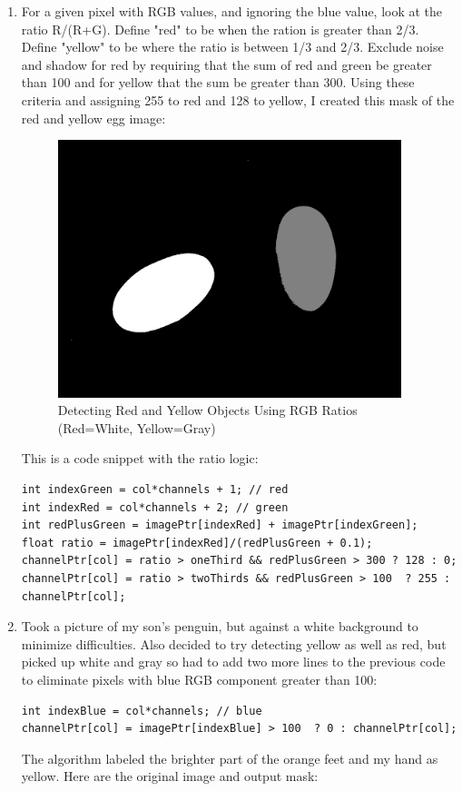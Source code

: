 \documentclass{article}
\begin{document}
\begin{enumerate}
\item
For a given pixel with RGB values, and ignoring the blue value, look at the ratio R/(R+G). Define "red" to be when the ration is greater than 2/3. Define "yellow" to be where the ratio is between 1/3 and 2/3. Exclude noise and shadow for red by requiring that the sum of red and green be greater than 100 and for yellow that the sum be greater than 300. Using these criteria and assigning 255 to red and 128 to yellow, I created this mask of the red and yellow egg image:
\begin{figure}[ht!]
\centering
\includegraphics[width=100mm]{detectRedAndYellowEgg.png}
\caption{Detecting Red and Yellow Objects Using RGB Ratios (Red=White, Yellow=Gray)}
\label{overflow}
\end{figure}


This is a code snippet with the ratio logic:
\begin{lstlisting}
int indexGreen = col*channels + 1; // red
int indexRed = col*channels + 2; // green
int redPlusGreen = imagePtr[indexRed] + imagePtr[indexGreen]; 
float ratio = imagePtr[indexRed]/(redPlusGreen + 0.1);
channelPtr[col] = ratio > oneThird && redPlusGreen > 300 ? 128 : 0; 
channelPtr[col] = ratio > twoThirds && redPlusGreen > 100  ? 255 : channelPtr[col];
\end{lstlisting}

\item
Took a picture of my son's penguin, but against a white background to minimize difficulties. Also decided to try detecting yellow as well as red, but picked up white and gray so had to add two more lines to the previous code to eliminate pixels with blue RGB component greater than 100:
\begin{lstlisting}
int indexBlue = col*channels; // blue
channelPtr[col] = imagePtr[indexBlue] > 100  ? 0 : channelPtr[col];
\end{lstlisting}
The algorithm labeled the brighter part of the orange feet and my hand as yellow. Here are the original image and output mask:


\end{enumerate}
\end{document}
